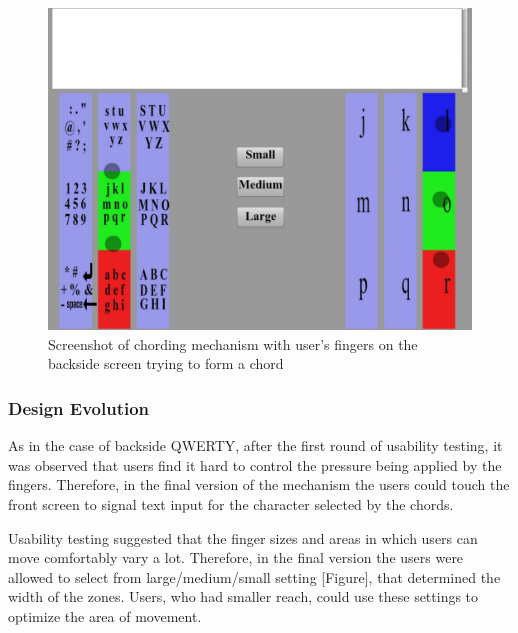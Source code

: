 \begin{figure}
    \includegraphics[scale=0.45]{Figures/chording.pdf} 
    \caption{Screenshot of chording mechanism with user's fingers on
      the backside screen trying to form a chord}
\end{figure} 
\subsubsection{Design Evolution}

As in the case of backside QWERTY, after the first round of usability
testing, it was observed that users find it hard to control the
pressure being applied by the fingers. Therefore, in the final version
of the mechanism the users could touch the front screen to signal text
input for the character selected by the chords.

Usability testing suggested that the finger sizes and areas in which
users can move comfortably vary a lot. Therefore, in the final version
the users were allowed to select from large/medium/small setting
[Figure], that determined the width of the zones. Users, who had
smaller reach, could use these settings to optimize the area of
movement.
